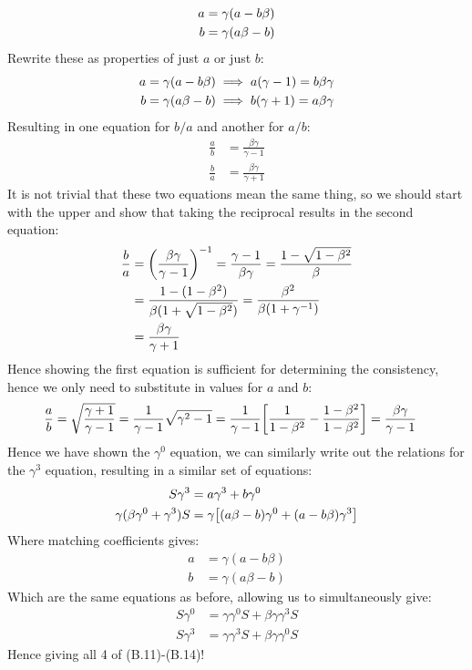 \documentclass[12pt]{article}
\begin{document}
\begin{align*}
  a&=\gamma\qty(a-b\beta)\\
  b&=\gamma\qty(a\beta-b)
\end{align*}
Rewrite these as properties of just $a$ or just $b$:
\begin{align*}
  a&=\gamma\qty(a-b\beta)\implies a(\gamma-1)=b\beta\gamma\\
  b&=\gamma\qty(a\beta-b)\implies b(\gamma+1)=a\beta\gamma
\end{align*}
Resulting in one equation for $b/a$ and another for $a/b$:
\begin{align*}
  \frac{a}{b}&=\frac{\beta\gamma}{\gamma-1}\\
  \frac{b}{a}&=\frac{\beta\gamma}{\gamma+1}
\end{align*}
It is not trivial that these two equations mean the same thing, so we should start with the upper and show that taking the reciprocal results in the second equation:
\begin{align*}
  \frac{b}{a}&=\qty(\frac{\beta\gamma}{\gamma-1})^{-1}
  =\frac{\gamma-1}{\beta\gamma}=\frac{1-\sqrt{1-\beta^2}}{\beta}\\
  &=\frac{1-(1-\beta^2)}{\beta(1+\sqrt{1-\beta^2})}=
  \frac{\beta^2}{\beta(1+\gamma^{-1})}\\
  &=\frac{\beta\gamma}{\gamma+1}
\end{align*}
Hence showing the first equation is sufficient for determining the consistency, hence we only need to substitute in values for $a$ and $b$:
\begin{align*}
  \frac{a}{b}&=\sqrt{\frac{\gamma+1}{\gamma-1}}
  =\frac1{\gamma-1}\sqrt{\gamma^2-1}=\frac1{\gamma-1}
  \qty[\frac1{1-\beta^2}-\frac{1-\beta^2}{1-\beta^2}]
  =\frac{\beta\gamma}{\gamma-1}
\end{align*}
Hence we have shown the $\gamma^0$ equation, we can similarly write out the relations for the $\gamma^3$ equation, resulting in a similar set of equations:
\begin{align*}
  S\gamma^3&=a\gamma^3+b\gamma^0\\
  \gamma(\beta\gamma^0+\gamma^3)S&=
  \gamma\qty[(a\beta-b)\gamma^0+(a-b\beta)\gamma^3]
\end{align*}
Where matching coefficients gives:
\begin{align*}
  a&=\gamma(a-b\beta)\\
  b&=\gamma(a\beta-b)
\end{align*}
Which are the same equations as before, allowing us to simultaneously give:
\begin{equation}
  \label{eq:p9b}
  \boxed{
    \begin{aligned}
      S\gamma^0&=\gamma\gamma^0 S+\beta\gamma\gamma^3S\\
      S\gamma^3&=\gamma\gamma^3 S+\beta\gamma\gamma^0S
    \end{aligned}
  }
\end{equation}
Hence giving all 4 of (B.11)-(B.14)!
\end{document}
